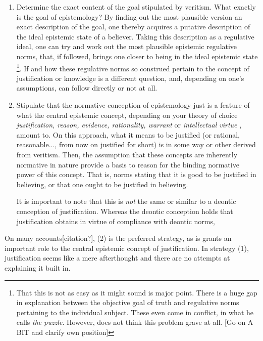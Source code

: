 \documentclass[12pt,numbers=noenddot]{scrartcl}
\begin{document}
\begin{enumerate}
    \item Determine the exact content of the goal stipulated by veritism. What exactly is the goal of epistemology? By finding out the most plausible version an exact description of the goal, one thereby acquires a putative description of the ideal epistemic state of a believer. Taking this description as a regulative ideal, one can try and work out the most plausible epistemic regulative norms, that, if followed, brings one closer to being in the ideal epistemic state
    \footnote{That this is not as easy as it might sound is \textcite{Gibbons2013-GIBTNO} major point. There is a huge gap in explanation between the objective goal of truth and regulative norms pertaining to the individual subject. These even come in conflict, in what he calls \emph{the puzzle}. However, \textcite{Goldman2002-GOLTUO-2} does not think this problem grave at all. [Go on A BIT and clarify own position]}.
    If and how these regulative norms so construed pertain to the concept of justification or knowledge is a different question, and, depending on one's assumptions, can follow directly or not at all.
    \item Stipulate that the normative conception of epistemology just is a feature of what the central epistemic concept, depending on your theory of choice \emph{justification, reason, evidence, rationality, warrant} or \emph{intellectual virtue} \autocite[153]{David2001-DAVTAT-7}, amount to. On this approach, what it means to be justified (or rational, reasonable..., from now on justified for short) is in some way or other derived from veritism. Then, the assumption that these concepts are inherently normative in nature provide a basis to reason for the binding normative power of this concept. That is, norms stating that it is good to be justified in believing, or that one ought to be justified in believing.

    It is important to note that this is \emph{not} the same or similar to a deontic conception of justification. Whereas the deontic conception holds that  justification obtains in virtue of compliance with deontic norms,
\end{enumerate}

On many accounts[citation?], (2) is the preferred strategy, as is grants an important role to the central epistemic concept of justification. In strategy (1), justification seems like a mere afterthought and there are no attempts at explaining it built in.
\end{document}
